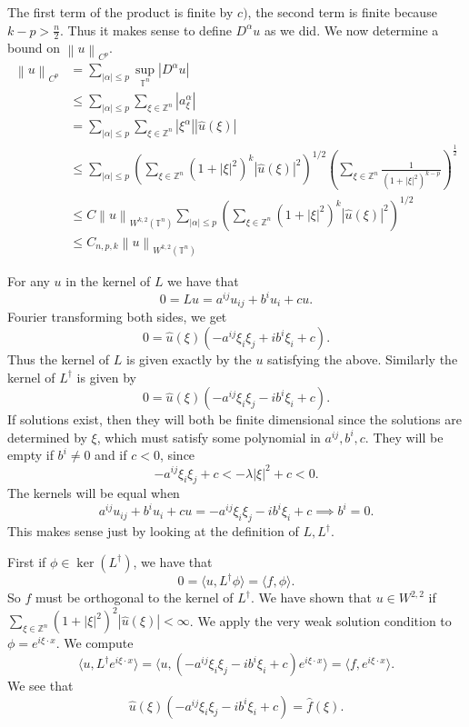\documentclass[12pt, a4paper]{article}
\theoremstyle{definition}
\newcommand{\Z}{\mathbb{Z}}                           %
\newcommand{\T}{\mathbb{T}}                         %
\newcommand{\lan}{\langle}
\newcommand{\ran}{\rangle}
\newcommand{\norm}[1]{\left\lVert#1\right\rVert}
\newcommand{\inn}[1]{\lan#1\ran}
\begin{document}
The first term of the product is finite by $c)$, the second term is finite because $k-p>\frac{n}{2}$. Thus it makes sense to define $D^\alpha u$ as we did. We now determine a bound on $\norm{u}_{C^p}$. 
\begin{align*}
	\norm{u}_{C^p} &= \sum_{|\alpha |\leq p} \sup_{\T^n} |D^\alpha u|
	\\ & \leq \sum_{|\alpha |\leq p} \sum_{\xi \in \Z^n}|a^\alpha_\xi| \tag{part $a)$}
	\\ & = \sum_{|\alpha |\leq p} \sum_{\xi \in \Z^n} |\xi^\alpha| |\hat{u}(\xi)|
	\\ & \leq \sum_{|\alpha |\leq p}\left(\sum_{\xi \in \Z^n} (1+|\xi|^2)^k| \hat{u}(\xi)|^2 \right)^{1/2} \left( \sum_{\xi \in \Z^n} \frac{1}{(1+|\xi|^2)^{k-p}} \right)^\frac{1}{2} \tag{by above}
	\\ & \leq C \norm{u}_{W^{k,2}(\T^n)} \sum_{|\alpha |\leq p}\left(\sum_{\xi \in \Z^n} (1+|\xi|^2)^k| \hat{u}(\xi)|^2 \right)^{1/2} \tag{by $c)$}
	\\ & \leq C_{n,p,k} \norm{u}_{W^{k,2}(\T^n)}
\end{align*} 
\item For any $u$ in the kernel of $L$ we have that 
$$0 = Lu = a^{ij}u_{ij} + b^i u_i + cu.$$
Fourier transforming both sides, we get
$$0 = \hat{u}(\xi) (-a^{ij}\xi_i \xi_j + ib^i \xi_i + c).$$
Thus the kernel of $L$ is given exactly by the $u$ satisfying the above. Similarly the kernel of $L^\dagger$ is given by 
$$0 = \hat{u}(\xi) (-a^{ij}\xi_i \xi_j - ib^i \xi_i + c).$$
If solutions exist, then they will both be finite dimensional since the solutions are determined by $\xi$, which must satisfy some polynomial in $a^{ij},b^i,c$. They will be empty if $b^i \neq 0$ and if $c < 0$, since 
$$-a^{ij} \xi_i \xi_j + c < -\lambda |\xi|^2 + c <0.$$
The kernels will be equal when 
$$a^{ij}u_{ij} + b^i u_i + cu = -a^{ij}\xi_i \xi_j - ib^i \xi_i + c \implies b^i = 0.$$
This makes sense just by looking at the definition of $L,L^\dagger$. 
\item First if $\phi \in \ker (L^\dagger)$, we have that 
$$0 = \inn{u, L^\dagger \phi} = \inn{f , \phi}. $$
So $f$ must be orthogonal to the kernel of $L^\dagger$. We have shown that $u\in W^{2,2}$ if $\sum_{\xi \in \Z^n} (1+|\xi|^2)^2 |\hat{u}(\xi)| < \infty$. We apply the very weak solution condition to $\phi = e^{i \xi \cdot x}$. We compute 
$$\inn{u, L^\dagger e^{i \xi \cdot x}} = \inn{u, (-a^{ij} \xi_i \xi_j - i b^i \xi_i +c) e^{i \xi \cdot x}} = \inn{f, e^{i \xi \cdot x}}. $$
We see that $$\hat{u} (\xi ) (-a^{ij} \xi_i \xi_j - i b^i \xi_i +c) = \hat{f}(\xi).$$
\end{document}
